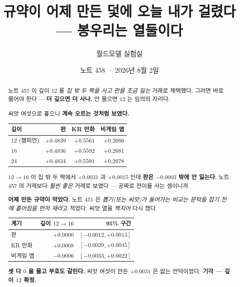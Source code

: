 \documentclass[11pt]{article}
\begin{document}
\title{규약이 어제 만든 덫에 오늘 내가 걸렸다 --- 봉우리는 열둘이다}
\author{월드모델 실험실}
\date{노트 458 · 2026년 8월 2일}
\maketitle

\begin{abstract}
노트 457 이 깊이 $12$ 를 \emph{집 밖 두 짝을 사고 판을 조금 잃는} 거래로
채택했다. 그러면 바로 물어야 한다 --- \textbf{더 깊으면 더 사나.} 안
물으면 $12$ 는 임의의 자리다.

씨앗 여섯으로 훑으니 \textbf{계속 오르는 것처럼 보였다.}

\begin{center}
\begin{tabular}{lrrr}
\hline
깊이 & 판 & KR 만화 & 비게임 앱 \\
\hline
$12$ (챔피언) & $+0.4839$ & $+0.5561$ & $+0.2666$ \\
$16$ & $+0.4836$ & $\mathbf{+0.5592}$ & $\mathbf{+0.2681}$ \\
$24$ & $+0.4834$ & $+0.5591$ & $+0.2678$ \\
\hline
\end{tabular}
\end{center}

$12 \to 16$ 이 집 밖 두 짝에서 $+0.0031$ 과 $+0.0015$ 인데 \textbf{판은
$-0.0003$ 밖에 안 잃는다}. 노트 457 의 거래보다 \emph{훨씬 좋은} 거래로
보였다 --- 공짜로 전이를 사는 셈이니까.

\textbf{어제 만든 규약이 막았다.} 노트 451 은 \emph{뽑기(또는 씨앗)가
들어가는 비교는 문턱을 잡기 전에 흩어짐을 먼저 재라}고 적었다. 씨앗 열을
\emph{짝지어} 다시 쟀다.

\begin{center}
\begin{tabular}{lrr}
\hline
계기 & 깊이 $12 \to 16$ & 95\% 구간 \\
\hline
판 & $+0.0000$ & $[-0.0012, +0.0013]$ \\
KR 만화 & $+0.0008$ & $[-0.0029, +0.0045]$ \\
비게임 앱 & $-0.0006$ & $[-0.0033, +0.0022]$ \\
\hline
\end{tabular}
\end{center}

\textbf{셋 다 $0$ 을 물고 부호도 갈린다.} 씨앗 여섯이 만든 $+0.0031$ 은
없는 언덕이었다. \textbf{기각 --- 깊이 $12$ 확정.}
\end{abstract}
\end{document}
